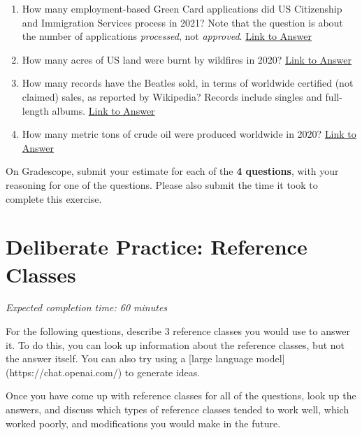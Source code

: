 \documentclass[11pt]{article}
\begin{document}
\begin{enumerate}
	\item How many employment-based Green Card applications did US Citizenship and Immigration Services process in 2021? Note that the question is about the number of applications \emph{processed}, not \emph{approved}. \href{https://www.uscis.gov/newsroom/news-releases/uscis-announces-fy-2021-accomplishments}{Link to Answer}
	\item How many acres of US land were burnt by wildfires in 2020? \href{https://sgp.fas.org/crs/misc/IF10244.pdf}{Link to Answer}
	\item How many records have the Beatles sold, in terms of worldwide certified (not claimed) sales, as reported by Wikipedia? Records include singles and full-length albums. \href{https://en.wikipedia.org/wiki/List_of_best-selling_music_artists#250_million_or_more_records}{Link to Answer}
	\item How many metric tons of crude oil were produced worldwide in 2020? \href{https://www.statista.com/statistics/265229/global-oil-production-in-million-metric-tons/#:~:text=In$\%$202020$\%$2C$\%$20global$\%$20crude$\%$20oil,about$\%$204.2$\%$20billion$\%$20metric$\%$20tons}{Link to Answer}
\end{enumerate}

On Gradescope, submit your estimate for each of the \textbf{4 questions}, with your reasoning for one of the questions. Please also submit the time it took to complete this exercise.

\section*{Deliberate Practice: Reference Classes}

\emph{Expected completion time: 60 minutes}

For the following questions, describe 3 reference classes you would use to answer it. To do this, you can look up information about the reference classes, but not the answer itself. You can also try using a [large language model](https://chat.openai.com/) to generate ideas.

Once you have come up with reference classes for all of the questions, look up the answers, and discuss which types of reference classes tended to work well, which worked poorly, and modifications you would make in the future. 
\end{document}

